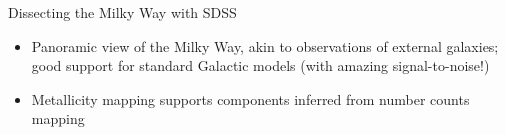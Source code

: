 \documentclass[letterpaper,landscape]{slides}
\begin{document}
\begin{slide}
{\begin{minipage}[t]{17cm}
\begin{center}
\vskip -1in
{\large \color{red} Dissecting the Milky Way with SDSS }
\end{center}

\begin{itemize}
\item {\color{blue} Panoramic view} of the Milky Way, akin to observations 
of external galaxies; {\color{blue} good support for standard Galactic models}
(with amazing signal-to-noise!)
\item
{\color{red} Metallicity mapping} supports components inferred 
from number counts mapping
\end{itemize}     

\vskip 0.05in

\end{minipage}}
\vfill 
\end{slide}



\end{document}
